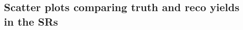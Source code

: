 
\chapter{}
\ifpdf
\graphicspath{{chapter-analysis/Figs/Raster/}{chapter-analysis/Figs/PDF/}{chapter-analysis/Figs/}}
\else
\graphicspath{{chapter-analysis/Figs/Vector/}{chapter-analysis/Figs/}}
\fi

\section{Scatter plots comparing truth and reco yields in the SRs}\label{app:pmssm_comp_SR_scatter}

